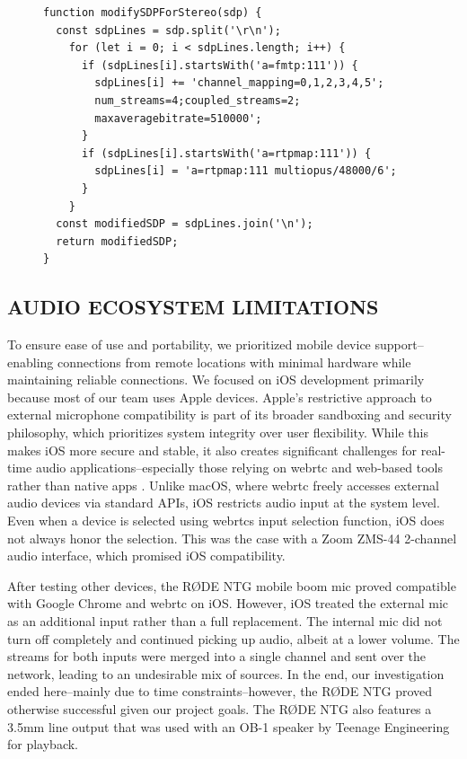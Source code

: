 \documentclass[fleqn]{jaes}
\begin{document}
\begin{figure}[h!]
\begin{lstlisting}[caption=SDP munging function, label=lst:sdp]
function modifySDPForStereo(sdp) {
  const sdpLines = sdp.split('\r\n');
    for (let i = 0; i < sdpLines.length; i++) {
      if (sdpLines[i].startsWith('a=fmtp:111')) {
        sdpLines[i] += 'channel_mapping=0,1,2,3,4,5';
        num_streams=4;coupled_streams=2;
        maxaveragebitrate=510000';
      }
      if (sdpLines[i].startsWith('a=rtpmap:111')) {
        sdpLines[i] = 'a=rtpmap:111 multiopus/48000/6';
      }
    }
  const modifiedSDP = sdpLines.join('\n');
  return modifiedSDP;
}
\end{lstlisting}
\end{figure}

\subsection{AUDIO ECOSYSTEM LIMITATIONS}
To ensure ease of use and portability, we prioritized mobile device support--enabling connections from remote locations with minimal hardware while maintaining reliable connections. We focused on iOS development primarily because most of our team uses Apple devices. Apple's restrictive approach to external microphone compatibility is part of its broader sandboxing and security philosophy, which prioritizes system integrity over user flexibility. While this makes iOS more secure and stable, it also creates significant challenges for real-time audio applications--especially those relying on \gls{webrtc} and web-based tools rather than native apps \cite{blochberger2019state}. Unlike macOS, where \gls{webrtc} freely accesses external audio devices via standard APIs, iOS restricts audio input at the system level. Even when a device is selected using \Glspl{webrtc} input selection function, iOS does not always honor the selection. This was the case with a Zoom ZMS-44 2-channel audio interface, which promised iOS compatibility.

After testing other devices, the R\O DE NTG mobile boom mic proved compatible with Google Chrome and \gls{webrtc} on iOS. However, iOS treated the external mic as an additional input rather than a full replacement. The internal mic did not turn off completely and continued picking up audio, albeit at a lower volume. The streams for both inputs were merged into a single channel and sent over the network, leading to an undesirable mix of sources. In the end, our investigation ended here--mainly due to time constraints--however, the R\O DE NTG proved otherwise successful given our project goals. The R\O DE NTG also features a 3.5mm line output that was used with an OB-1 speaker by Teenage Engineering for playback.
\end{document}
